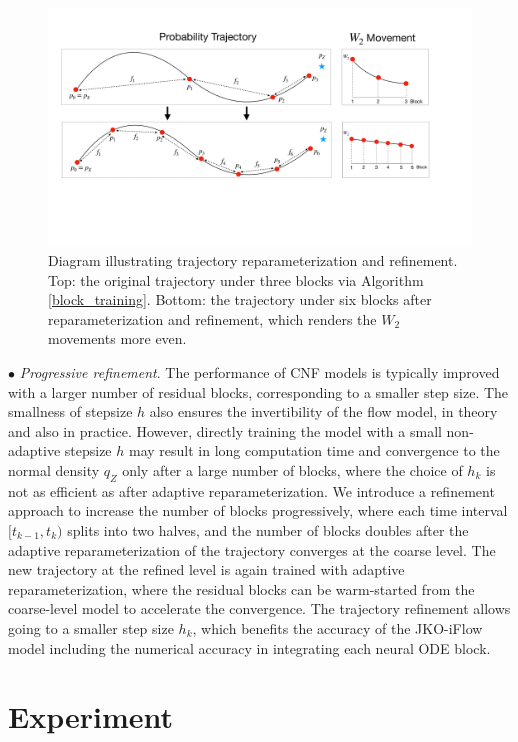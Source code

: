 \documentclass{article}
\theoremstyle{remark}
\theoremstyle{plain}
\newcommand{\JKO}{JKO-iFlow}
\begin{document}
{%
\begin{figure}[!t]
    \centering
    \includegraphics[width=0.7\linewidth]{JKO-Flow.pdf}
    \caption{
    Diagram illustrating trajectory reparameterization and refinement. 
    Top: the original trajectory under three blocks via Algorithm \ref{block_training}.
    Bottom: the trajectory under six blocks after reparameterization and refinement,
    which renders the $W_2$ movements more even.}
    \label{enhanced_illu}
\end{figure}

$\bullet$  {\it  Progressive refinement}. 
The performance of CNF models is typically improved with a larger number of residual blocks, corresponding to a smaller step size.
The smallness of stepsize $h$ also ensures the invertibility of the flow model, in theory and also in practice. 
However, directly training the model with a small non-adaptive stepsize $h$ may result in long computation time and convergence to the normal density $q_Z$ only after a large number of blocks, where the choice of $h_k$ is not as efficient as after adaptive reparameterization. 
We introduce a refinement approach to increase the number of blocks progressively, where each time interval $[t_{k-1}, t_k)$ splits into two halves, and the number of blocks doubles after the adaptive reparameterization of the trajectory converges at the coarse level. 
The new trajectory at the refined level is again trained with adaptive reparameterization, where the residual blocks can be warm-started from the coarse-level model to accelerate the convergence.
The trajectory refinement allows going to a smaller step size $h_k$, which benefits the accuracy of the \JKO{} model including the numerical accuracy in integrating each neural ODE block.



\section{Experiment}\label{sec:experiment}


}
\end{document}
